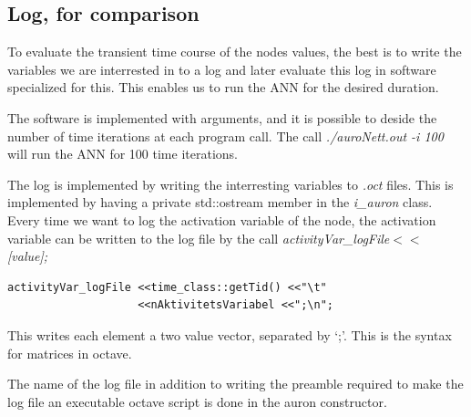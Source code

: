 %




\subsection{Log, for comparison}
\label{ssecLogForComparison}
To evaluate the transient time course of the nodes values, the best is to write the variables we are interrested in to a log and later evaluate this log in software specialized for this.
This enables us to run the ANN for the desired duration. 

The software is implemented with arguments, and it is possible to deside the number of time iterations at each program call.
The call \emph{./auroNett.out -i 100} will run the ANN for 100 time iterations.

The log is implemented by writing the interresting variables to \emph{.oct} files. This is implemented by having a private std::ostream member in the \emph{i\_auron} class.
Every time we want to log the activation variable of the node, the activation variable can be written to the log file by the call \emph{activityVar\_logFile$<<$ [value];}
\begin{lstlisting}
activityVar_logFile <<time_class::getTid() <<"\t" 
				    <<nAktivitetsVariabel <<";\n";
\end{lstlisting}

This writes each element a two value vector, separated by `;'. This is the syntax for matrices in octave.

The name of the log file in addition to writing the preamble required to make the log file an executable octave script is done in the auron constructor.

